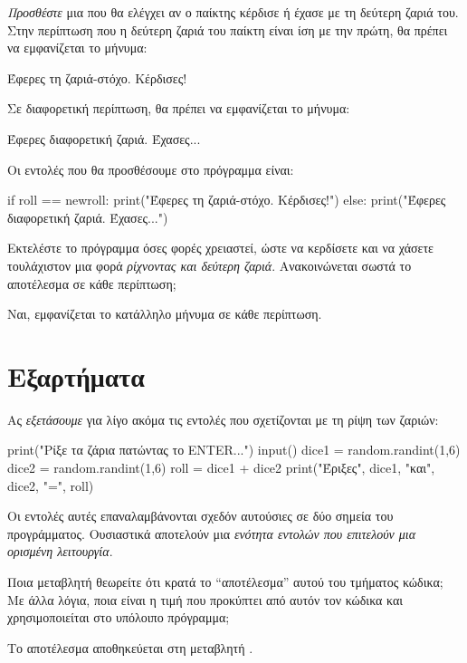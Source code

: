 \documentclass[a4paper,11pt,oneside]{book}
\begin{document}
\begin{step}
\emph{Προσθέστε} μια  που θα ελέγχει αν ο παίκτης κέρδισε ή έχασε με τη δεύτερη ζαριά του.
Στην περίπτωση που η δεύτερη ζαριά του παίκτη είναι ίση με την πρώτη, θα πρέπει να εμφανίζεται το μήνυμα:

\marginnote[16pt]{\iconcomputer}
\begin{pyterm}
Έφερες τη ζαριά-στόχο. Κέρδισες!
\end{pyterm}

\clearpage
Σε διαφορετική περίπτωση, θα πρέπει να εμφανίζεται το μήνυμα:

\marginnote[16pt]{\iconcomputer}
\begin{pyterm}
Έφερες διαφορετική ζαριά. Έχασες...
\end{pyterm}

\begin{answer}
Οι εντολές που θα προσθέσουμε στο πρόγραμμα είναι:

\begin{pynew}
if roll == newroll:
    print("Έφερες τη ζαριά-στόχο. Κέρδισες!")
else:
    print("Έφερες διαφορετική ζαριά. Έχασες...")    
\end{pynew}
\end{answer}

Εκτελέστε το πρόγραμμα όσες φορές χρειαστεί, ώστε να κερδίσετε και να χάσετε τουλάχιστον μια φορά \emph{ρίχνοντας και δεύτερη ζαριά}. Ανακοινώνεται σωστά το αποτέλεσμα σε κάθε περίπτωση;

\begin{answer}
Ναι, εμφανίζεται το κατάλληλο μήνυμα σε κάθε περίπτωση.
\end{answer}
\end{step}

\section{Εξαρτήματα}

\begin{step}
\label{step:roll-commands}
Ας \emph{εξετάσουμε} για λίγο ακόμα τις εντολές που σχετίζονται με τη ρίψη των ζαριών:

\begin{pyplain}
print("Ρίξε τα ζάρια πατώντας το ENTER...")
input()
dice1 = random.randint(1,6)
dice2 = random.randint(1,6)
roll = dice1 + dice2
print("Έριξες", dice1, "και", dice2, "=", roll)
\end{pyplain}

Οι εντολές αυτές επαναλαμβάνονται σχεδόν αυτούσιες σε δύο σημεία του προγράμματος. Ουσιαστικά αποτελούν μια \emph{ενότητα εντολών που επιτελούν μια ορισμένη λειτουργία}. 

Ποια μεταβλητή θεωρείτε ότι κρατά το ``αποτέλεσμα'' αυτού του τμήματος κώδικα; Με άλλα λόγια, ποια είναι η τιμή που προκύπτει από αυτόν τον κώδικα και χρησιμοποιείται στο υπόλοιπο πρόγραμμα;

\begin{answer}
Το αποτέλεσμα αποθηκεύεται στη μεταβλητή .
\end{answer}
\end{step}
\end{document}
